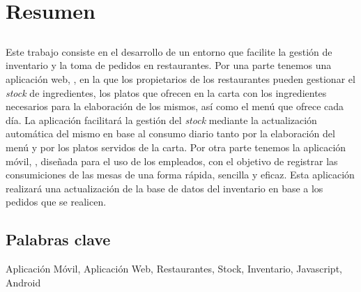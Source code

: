 \chapter*{Resumen}

\section*{\tituloPortadaVal}

Este trabajo consiste en el desarrollo de un entorno que facilite la gestión de inventario y la toma de pedidos en  restaurantes. Por una parte tenemos una aplicación web, \appadm, en la que los propietarios de los restaurantes pueden gestionar el \textit{stock} de ingredientes, los platos que ofrecen en la carta con los ingredientes necesarios para la elaboración de los mismos, así como el menú que ofrece cada día. La aplicación facilitará la gestión del \textit{stock} mediante la actualización automática del mismo en base al consumo diario tanto por la elaboración del menú y por los platos servidos de la carta. Por otra parte tenemos la aplicación móvil, \appweb, diseñada para el uso de los empleados, con el objetivo de registrar las consumiciones de las mesas de una forma rápida, sencilla y eficaz. Esta aplicación realizará una actualización de la base de datos del inventario en base a los pedidos que se realicen. 


\section*{Palabras clave}
   
\noindent Aplicación Móvil, Aplicación Web, Restaurantes, Stock, Inventario, Javascript, Android

   


